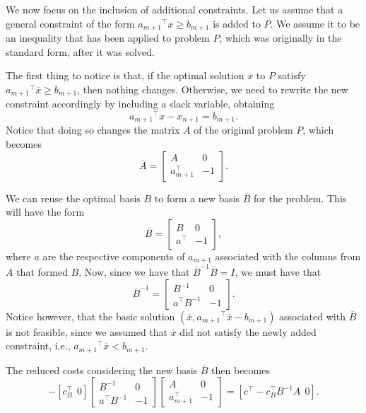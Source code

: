 We now focus on the inclusion of additional constraints. Let us assume that a general constraint of the form ${a_{m+1}}^\top x \geq b_{m+1}$ is added to $P$. We assume it to be an inequality that has been applied to problem $P$, which was originally in the standard form, after it was solved.

The first thing to notice is that, if the optimal solution $\overline{x}$ to $P$ satisfy ${a_{m+1}}^\top \overline{x} \geq b_{m+1}$, then nothing changes. Otherwise, we need to rewrite the new constraint accordingly by including a slack variable, obtaining 
%
\begin{equation*}
	{a_{m+1}}^\top x - x_{n+1} = b_{m+1}.
\end{equation*}
%
Notice that doing so changes the matrix $A$ of the original problem $P$, which becomes
%
\begin{equation*}
	\overline{A} = \begin{bmatrix}
				   A & 0 \\ a^\top_{m+1} & -1 
				   \end{bmatrix}.
\end{equation*}

We can reuse the optimal basis $B$ to form a new basis $\overline{B}$ for the problem. This will have the form
%
\begin{equation*}
	\overline{B} = \begin{bmatrix}
		B & 0 \\ a^\top & -1 
	\end{bmatrix},	
\end{equation*}
%
where $a$ are the respective components of $a_{m+1}$ associated with the columns from $A$ that formed $B$. Now, since we have that $\overline{B}^{-1}\overline{B} = I$, we must have that 
%
\begin{equation*}
	\overline{B}^{-1} = \begin{bmatrix}
		B^{-1} & 0 \\ a^\top B^{-1} & -1 
	\end{bmatrix}.	
\end{equation*}
%
Notice however, that the basic solution $(\overline{x}, {a_{m+1}}^\top \overline{x} -  b_{m+1})$ associated with $\overline{B}$ is not feasible, since we assumed that $\overline{x}$ did not satisfy the newly added constraint, i.e., ${a_{m+1}}^\top \overline{x} < b_{m+1}$.

The reduced costs considering the new basis $\overline{B}$ then becomes
%
\begin{equation*}
	[c^\top ~~ 0] - [c_B^\top ~~ 0]\begin{bmatrix} B^{-1} & 0 \\ a^\top B^{-1} & -1 \end{bmatrix}\begin{bmatrix} A & 0 \\ a_{m+1}^\top & -1 \end{bmatrix} = [c^\top - c^\top_B B^{-1}A ~~ 0].
\end{equation*}
  	

